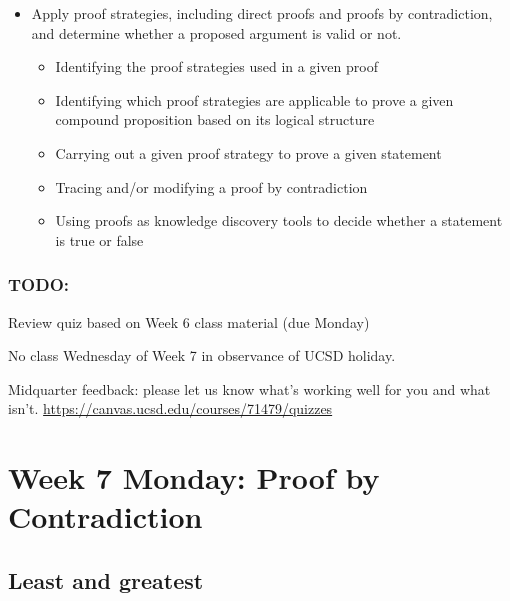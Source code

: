 \documentclass[12pt, oneside]{article}
\begin{document}
\begin{itemize}
\item Apply proof strategies, including direct proofs and proofs by contradiction, and determine whether a proposed argument is valid or not.
\begin{itemize}
    \item Identifying the proof strategies used in a given proof
    \item Identifying which proof strategies are applicable to prove a given compound proposition based on its logical structure
    \item Carrying out a given proof strategy to prove a given statement
    \item Tracing and/or modifying a proof by contradiction
    \item Using proofs as knowledge discovery tools to decide whether a statement is true or false
\end{itemize}

\end{itemize}

\subsubsection*{TODO:}
\begin{list}
   {\itemsep2pt}
    \item Review quiz based on Week 6 class material (due Monday)
    \item No class Wednesday of Week 7 in observance of UCSD holiday.
    \item Midquarter feedback: please let us know what's working well for you and what isn't.  \url{https://canvas.ucsd.edu/courses/71479/quizzes}
\end{list}

\newpage


\section*{Week 7 Monday: Proof by Contradiction}



 \subsection*{Least and greatest}
\end{document}
